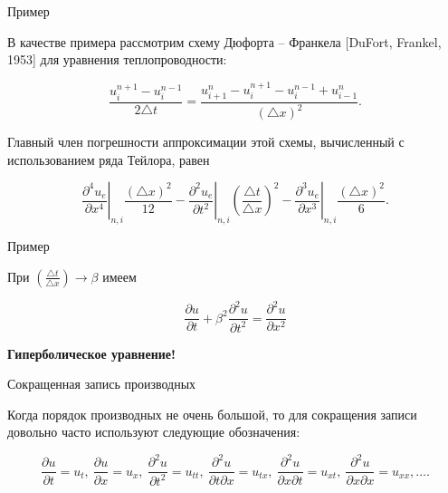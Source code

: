 \documentclass[10pt,xcolor=pst,aspectratio=169]{beamer}
\begin{document}
\begin{frame}{Пример}

    \transdissolve[duration=0.1]
    \justifying
    \large

    В качестве примера рассмотрим схему Дюфорта -- Франкела [DuFort, Frankel, 1953] для уравнения теплопроводности:

    \[
        \frac{u^{n + 1}_{i} - u^{n - 1}_{i}}{2 \triangle t} = \frac{u^{n}_{i + 1} - u^{n + 1}_{i} - u^{n - 1}_{i}+ u^{n}_{i - 1}}{\left(\triangle x\right)^{2}}.
    \]

    Главный член погрешности аппроксимации этой схемы, вычисленный с использованием ряда Тейлора, равен

    \[
       \left. \frac{\partial^{4} u_{e}}{\partial x^{4}} \right|_{n, i} \frac{\left( \triangle x \right)^{2}}{12} -  \left. \frac{\partial^{2} u_{e}}{\partial t^{2}} \right|_{n, i} \left( \frac{\triangle t}{\triangle x} \right)^{2} - \left. \frac{\partial^{3} u_{e}}{\partial x^{3}} \right|_{n, i} \frac{\left( \triangle x \right)^{2}}{6}.
    \]

\end{frame}

\begin{frame}{Пример}

    \transdissolve[duration=0.1]
    \justifying
    \large

    При $\left( \frac{\triangle t}{\triangle x} \right) \rightarrow \beta$ имеем

    \[
        \frac{\partial u}{\partial t} + \beta^{2} \frac{\partial^{2} u}{\partial t^{2}} = \frac{\partial^{2} u}{\partial x^{2}}
    \]

    \begin{center}
        \textbf{Гиперболическое уравнение!}
    \end{center}

\end{frame}

\begin{frame}{Сокращенная запись производных}

    \transdissolve[duration=0.1]
    \justifying
    \large

    Когда порядок производных не очень большой, то для сокращения записи довольно часто используют следующие обозначения:

    \[
        \frac{\partial u}{\partial t} = u_{t}, \: \frac{\partial u}{\partial x} = u_{x}, \: \frac{\partial^{2} u}{\partial t^{2}} = u_{tt}, \: \frac{\partial^{2} u}{\partial t \partial x} = u_{tx}, \: \frac{\partial^{2} u}{\partial x \partial t} = u_{xt}, \: \frac{\partial^{2} u}{\partial x \partial x} = u_{xx}, \ldots.
    \]

\end{frame}
\end{document}
